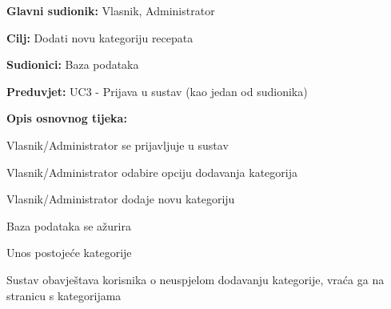					\noindent {}
					\begin{packed_item}
	
						\item \textbf{Glavni sudionik: } Vlasnik, Administrator
						\item  \textbf{Cilj:} Dodati novu kategoriju recepata
						\item  \textbf{Sudionici:} Baza podataka
						\item  \textbf{Preduvjet:} UC3 - Prijava u sustav (kao jedan od sudionika)
						\item  \textbf{Opis osnovnog tijeka:}
						
						\item[] \begin{packed_enum}
							
							\item Vlasnik/Administrator se prijavljuje u sustav
							\item Vlasnik/Administrator odabire opciju dodavanja kategorija
							\item Vlasnik/Administrator dodaje novu kategoriju
							\item Baza podataka se ažurira
						\end{packed_enum}

						\item[] \begin{packed_item}
	
							\item[3.a] Unos postojeće kategorije
							\item[] \begin{packed_enum}
								
								\item Sustav obavještava korisnika o neuspjelom dodavanju 
								kategorije, vraća ga na stranicu s kategorijama
								
							\end{packed_enum}
						\end{packed_item}
					\end{packed_item}

